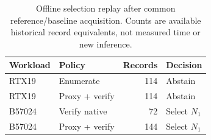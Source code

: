 \begin{table}[t]
\centering
\caption{Offline selection replay after common reference/baseline acquisition. Counts are available historical record equivalents, not measured time or new inference.}
\label{tab:selection}
\begin{tabular}{@{}llrl@{}}
\toprule
Workload & Policy & Records & Decision \\
\midrule
RTX19 & Enumerate & 114 & Abstain \\
RTX19 & Proxy + verify & 114 & Abstain \\
B57024 & Verify native & 72 & Select $N_1$ \\
B57024 & Proxy + verify & 144 & Select $N_1$ \\
\bottomrule
\end{tabular}
\end{table}
